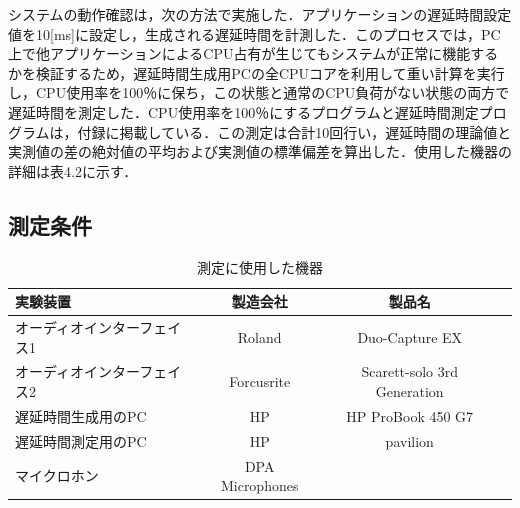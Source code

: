 システムの動作確認は，次の方法で実施した．アプリケーションの遅延時間設定値を10[ms]に設定し，生成される遅延時間を計測した．このプロセスでは，PC上で他アプリケーションによるCPU占有が生じてもシステムが正常に機能するかを検証するため，遅延時間生成用PCの全CPUコアを利用して重い計算を実行し，CPU使用率を100％に保ち，この状態と通常のCPU負荷がない状態の両方で遅延時間を測定した．CPU使用率を100％にするプログラムと遅延時間測定プログラムは，付録に掲載している．この測定は合計10回行い，遅延時間の理論値と実測値の差の絶対値の平均および実測値の標準偏差を算出した．使用した機器の詳細は表4.2に示す．
\subsection{測定条件}
\begin{table}[hbtp]
  \caption{測定に使用した機器}
  \label{table:device_delay_check}
  \centering
  \begin{tabular}{lccc}
    \hline
    実験装置 & 製造会社 & 製品名\\
    \hline \hline
    オーディオインターフェイス1  & Roland & Duo-Capture EX\\
    オーディオインターフェイス2  & Forcusrite & Scarett-solo 3rd Generation\\
    遅延時間生成用のPC  & HP & HP ProBook 450 G7\\
    遅延時間測定用のPC  & HP & pavilion\\
    マイクロホン  & DPA Microphones & 
\\
    \hline
  \end{tabular}
\end{table}

